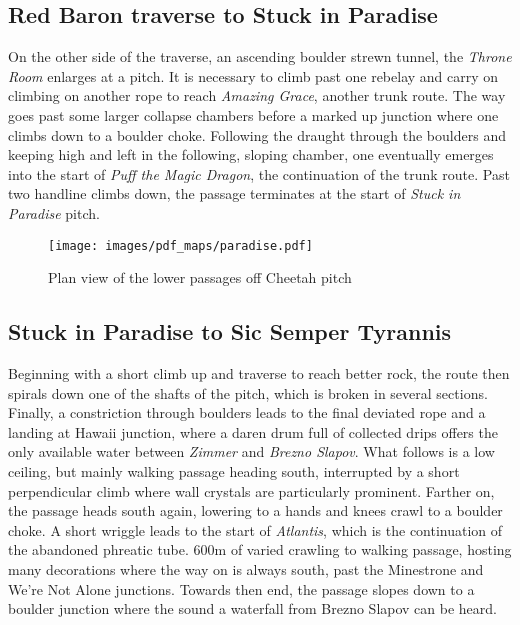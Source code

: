 \subsection{Red Baron traverse to Stuck in Paradise}
On the other side of the traverse, an ascending boulder strewn tunnel, the \emph{Throne Room} enlarges at a pitch. It is necessary to climb past one rebelay and carry on climbing on another rope to reach \emph{Amazing Grace}, another trunk route. The way goes past some larger collapse chambers before a marked up junction where one climbs down to a boulder choke. Following the draught through the boulders and keeping high and left in the following, sloping chamber, one eventually emerges into the start of \emph{Puff the Magic Dragon}, the continuation of the trunk route. Past two handline climbs down, the passage terminates at the start of \emph{Stuck in Paradise} pitch.

\begin{figure*}[t!]
\checkoddpage \ifoddpage \forcerectofloat \else \forceversofloat \fi
\centering
\texttt{[image: images/pdf\_maps/paradise.pdf]}
\caption{Plan view of the lower passages off Cheetah pitch}
\label{paradise}
\end{figure*}

\subsection{Stuck in Paradise to Sic Semper Tyrannis}
Beginning with a short climb up and traverse to reach better rock, the route then spirals down one of the shafts of the pitch, which is broken in several sections. Finally, a constriction through boulders leads to the final deviated rope and a landing at Hawaii junction, where a daren drum full of collected drips offers the only available water between \emph{Zimmer} and \emph{Brezno Slapov}. What follows is a low ceiling, but mainly walking passage heading south, interrupted by a short perpendicular climb where wall crystals are particularly prominent. Farther on, the passage heads south again, lowering to a hands and knees crawl to a boulder choke. A short wriggle leads to the start of \emph{Atlantis}, which is the continuation of the abandoned phreatic tube. 600m of varied crawling to walking passage, hosting many decorations  where the way on is always south, past the Minestrone and We're Not Alone junctions. Towards then end, the passage slopes down to a boulder junction where the sound a waterfall from Brezno Slapov can be heard. 

